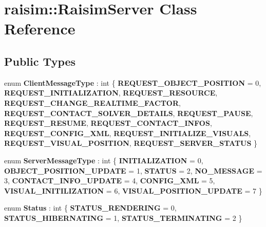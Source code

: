 \hypertarget{classraisim_1_1RaisimServer}{}\section{raisim\+:\+:Raisim\+Server Class Reference}
\label{classraisim_1_1RaisimServer}
\subsection*{Public Types}
\begin{DoxyCompactItemize}
\item 
\mbox{\label{classraisim_1_1RaisimServer_adcf5f6ccea237f0bffde24340f3a9b98}} 
enum {\bfseries Client\+Message\+Type} \+: int \{ \newline
{\bfseries R\+E\+Q\+U\+E\+S\+T\+\_\+\+O\+B\+J\+E\+C\+T\+\_\+\+P\+O\+S\+I\+T\+I\+ON} = 0, 
{\bfseries R\+E\+Q\+U\+E\+S\+T\+\_\+\+I\+N\+I\+T\+I\+A\+L\+I\+Z\+A\+T\+I\+ON}, 
{\bfseries R\+E\+Q\+U\+E\+S\+T\+\_\+\+R\+E\+S\+O\+U\+R\+CE}, 
{\bfseries R\+E\+Q\+U\+E\+S\+T\+\_\+\+C\+H\+A\+N\+G\+E\+\_\+\+R\+E\+A\+L\+T\+I\+M\+E\+\_\+\+F\+A\+C\+T\+OR}, 
\newline
{\bfseries R\+E\+Q\+U\+E\+S\+T\+\_\+\+C\+O\+N\+T\+A\+C\+T\+\_\+\+S\+O\+L\+V\+E\+R\+\_\+\+D\+E\+T\+A\+I\+LS}, 
{\bfseries R\+E\+Q\+U\+E\+S\+T\+\_\+\+P\+A\+U\+SE}, 
{\bfseries R\+E\+Q\+U\+E\+S\+T\+\_\+\+R\+E\+S\+U\+ME}, 
{\bfseries R\+E\+Q\+U\+E\+S\+T\+\_\+\+C\+O\+N\+T\+A\+C\+T\+\_\+\+I\+N\+F\+OS}, 
\newline
{\bfseries R\+E\+Q\+U\+E\+S\+T\+\_\+\+C\+O\+N\+F\+I\+G\+\_\+\+X\+ML}, 
{\bfseries R\+E\+Q\+U\+E\+S\+T\+\_\+\+I\+N\+I\+T\+I\+A\+L\+I\+Z\+E\+\_\+\+V\+I\+S\+U\+A\+LS}, 
{\bfseries R\+E\+Q\+U\+E\+S\+T\+\_\+\+V\+I\+S\+U\+A\+L\+\_\+\+P\+O\+S\+I\+T\+I\+ON}, 
{\bfseries R\+E\+Q\+U\+E\+S\+T\+\_\+\+S\+E\+R\+V\+E\+R\+\_\+\+S\+T\+A\+T\+US}
 \}
\item 
\mbox{\label{classraisim_1_1RaisimServer_a30ae63e5f9a63c4fb4f6b8737abcd8d1}} 
enum {\bfseries Server\+Message\+Type} \+: int \{ \newline
{\bfseries I\+N\+I\+T\+I\+A\+L\+I\+Z\+A\+T\+I\+ON} = 0, 
{\bfseries O\+B\+J\+E\+C\+T\+\_\+\+P\+O\+S\+I\+T\+I\+O\+N\+\_\+\+U\+P\+D\+A\+TE} = 1, 
{\bfseries S\+T\+A\+T\+US} = 2, 
{\bfseries N\+O\+\_\+\+M\+E\+S\+S\+A\+GE} = 3, 
\newline
{\bfseries C\+O\+N\+T\+A\+C\+T\+\_\+\+I\+N\+F\+O\+\_\+\+U\+P\+D\+A\+TE} = 4, 
{\bfseries C\+O\+N\+F\+I\+G\+\_\+\+X\+ML} = 5, 
{\bfseries V\+I\+S\+U\+A\+L\+\_\+\+I\+N\+I\+T\+I\+L\+I\+Z\+A\+T\+I\+ON} = 6, 
{\bfseries V\+I\+S\+U\+A\+L\+\_\+\+P\+O\+S\+I\+T\+I\+O\+N\+\_\+\+U\+P\+D\+A\+TE} = 7
 \}
\item 
\mbox{\label{classraisim_1_1RaisimServer_a9ae174afb463d443bf234cff6047b831}} 
enum {\bfseries Status} \+: int \{ {\bfseries S\+T\+A\+T\+U\+S\+\_\+\+R\+E\+N\+D\+E\+R\+I\+NG} = 0, 
{\bfseries S\+T\+A\+T\+U\+S\+\_\+\+H\+I\+B\+E\+R\+N\+A\+T\+I\+NG} = 1, 
{\bfseries S\+T\+A\+T\+U\+S\+\_\+\+T\+E\+R\+M\+I\+N\+A\+T\+I\+NG} = 2
 \}
\end{DoxyCompactItemize}

